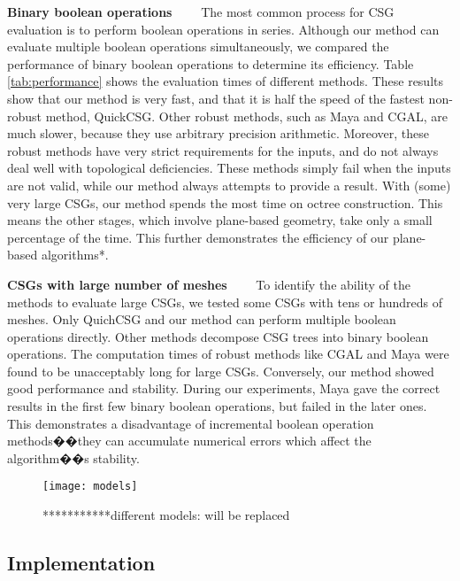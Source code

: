 \vspace{0.5em}
\noindent\textbf{Binary boolean operations}~~~~
The most common process for CSG evaluation is to perform boolean operations in series. Although our method can evaluate multiple boolean operations simultaneously, we compared the performance of binary boolean operations to determine its efficiency. Table \ref{tab:performance} shows the evaluation times of different methods. These results show that  our method is very fast, and that it is half the speed of the fastest non-robust method, QuickCSG. Other robust methods, such as Maya and CGAL, are much slower, because they use arbitrary precision arithmetic. Moreover, these robust methods have very strict requirements for the inputs, and do not always deal well with topological deficiencies. These methods simply fail when the inputs are not valid, while our method always attempts to provide a result. With (some) very large CSGs, our method spends the most time on octree construction. This means the other stages, which involve plane-based geometry, take only a small percentage of the time. This further demonstrates the efficiency of our plane-based algorithms*.

\vspace{0.5em}
\noindent\textbf{CSGs with large number of meshes}~~~~
To identify the ability of the methods to evaluate large CSGs, we tested some CSGs with tens or hundreds of meshes. Only QuichCSG and our method can perform multiple boolean operations directly. Other methods decompose CSG trees into binary boolean operations. The computation times of robust methods like CGAL and Maya were found to be unacceptably long for large CSGs. Conversely,  our method showed good performance and stability. During our experiments, Maya gave the correct results in the first few binary boolean operations, but failed in the later ones. This demonstrates a disadvantage of incremental boolean operation methods��they can accumulate numerical errors which affect the algorithm��s stability.


\begin{figure*}[!t]
\centering
\texttt{[image: models]}
\caption{***********different models: will be replaced}
\label{fig:models}
\end{figure*}

\subsection{Implementation}
\label{sec:esubroutine}


